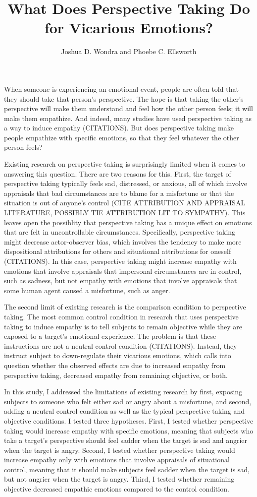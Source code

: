 \documentclass[man,a4paper,noextraspace,apacite]{apa6}\usepackage[]{graphicx}\usepackage[]{color}
\title{What Does Perspective Taking Do for Vicarious Emotions?}
\author{Joshua D. Wondra and Phoebe C. Ellsworth}
\affiliation{University of Michigan}
\begin{document}
\maketitle

When someone is experiencing an emotional event, people are often told that they should take that person's perspective. The hope is that taking the other's perspective will make them understand and feel how the other person feels; it will make them empathize. And indeed, many studies have used perspective taking as a way to induce empathy (CITATIONS). But does perspective taking make people empathize with specific emotions, so that they feel whatever the other person feels?

Existing research on perspective taking is surprisingly limited when it comes to answering this question. There are two reasons for this. First, the target of perspective taking typically feels sad, distressed, or anxious, all of which involve appraisals that bad circumstances are to blame for a misfortune or that the situation is out of anyone's control (CITE ATTRIBUTION AND APPRAISAL LITERATURE, POSSIBLY TIE ATTRIBUTION LIT TO SYMPATHY). This leaves open the possiblity that perspective taking has a unique effect on emotions that are felt in uncontrollable circumstances. Specifically, perspective taking might decrease actor-observer bias, which involves the tendency to make more dispositional attributions for others and situational attributions for oneself (CITATIONS). In this case, perspective taking might increase empathy with emotions that involve appraisals that impersonal circumstances are in control, such as sadness, but not empathy with emotions that involve appraisals that some human agent caused a misfortune, such as anger.

The second limit of existing research is the comparison condition to perspective taking. The most common control condition in research that uses perspective taking to induce empathy is to tell subjects to remain objective while they are exposed to a target's emotional experience. The problem is that these instructions are not a neutral control condition (CITATIONS). Instead, they instruct subject to down-regulate their vicarious emotions, which calls into question whether the observed effects are due to increased empathy from perspective taking, decreased empathy from remaining objective, or both.

In this study, I addressed the limitations of existing research by first, exposing subjects to someone who felt either sad or angry about a misfortune, and second, adding a neutral control condition as well as the typical perspective taking and objective conditions. I tested three hypotheses. First, I tested whether perspective taking would increase empathy with specific emotions, meaning that subjects who take a target's perspective should feel sadder when the target is sad and angrier when the target is angry. Second, I tested whether perspective taking would increase empathy only with emotions that involve appraisals of situational control, meaning that it should make subjects feel sadder when the target is sad, but not angrier when the target is angry. Third, I tested whether remaining objective decreased empathic emotions compared to the control condition. 
\end{document}
